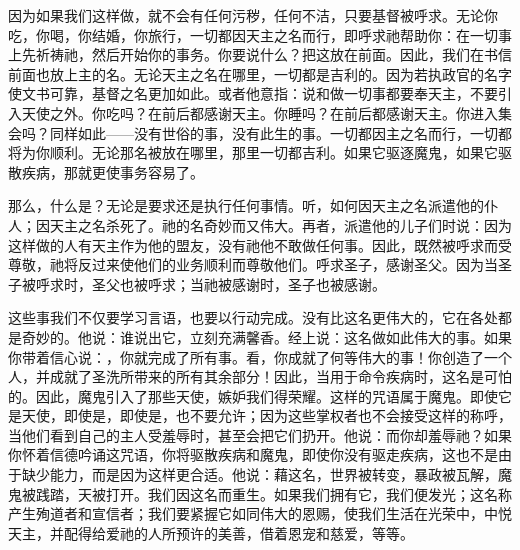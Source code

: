 因为如果我们这样做，就不会有任何污秽，任何不洁，只要基督被呼求。无论你吃，你喝，你结婚，你旅行，一切都因天主之名而行，即呼求祂帮助你：在一切事上先祈祷祂，然后开始你的事务。你要说什么？把这放在前面。因此，我们在书信前面也放上主的名。无论天主之名在哪里，一切都是吉利的。因为若执政官的名字使文书可靠，基督之名更加如此。或者他意指：说和做一切事都要奉天主，不要引入天使之外。你吃吗？在前后都感谢天主。你睡吗？在前后都感谢天主。你进入集会吗？同样如此——没有世俗的事，没有此生的事。一切都因主之名而行，一切都将为你顺利。无论那名被放在哪里，那里一切都吉利。如果它驱逐魔鬼，如果它驱散疾病，那就更使事务容易了。\par

那么，什么是？无论是要求还是执行任何事情。听，如何因天主之名派遣他的仆人；因天主之名杀死了。祂的名奇妙而又伟大。再者，派遣他的儿子们时说：因为这样做的人有天主作为他的盟友，没有祂他不敢做任何事。因此，既然被呼求而受尊敬，祂将反过来使他们的业务顺利而尊敬他们。呼求圣子，感谢圣父。因为当圣子被呼求时，圣父也被呼求；当祂被感谢时，圣子也被感谢。\par

这些事我们不仅要学习言语，也要以行动完成。没有比这名更伟大的，它在各处都是奇妙的。他说：谁说出它，立刻充满馨香。经上说：这名做如此伟大的事。如果你带着信心说：，你就完成了所有事。看，你成就了何等伟大的事！你创造了一个人，并成就了圣洗所带来的所有其余部分！因此，当用于命令疾病时，这名是可怕的。因此，魔鬼引入了那些天使，嫉妒我们得荣耀。这样的咒语属于魔鬼。即使它是天使，即使是，即使是，也不要允许；因为这些掌权者也不会接受这样的称呼，当他们看到自己的主人受羞辱时，甚至会把它们扔开。他说：而你却羞辱祂？如果你怀着信德吟诵这咒语，你将驱散疾病和魔鬼，即使你没有驱走疾病，这也不是由于缺少能力，而是因为这样更合适。他说：藉这名，世界被转变，暴政被瓦解，魔鬼被践踏，天被打开。我们因这名而重生。如果我们拥有它，我们便发光；这名称产生殉道者和宣信者；我们要紧握它如同伟大的恩赐，使我们生活在光荣中，中悦天主，并配得给爱祂的人所预许的美善，借着恩宠和慈爱，等等。\par


